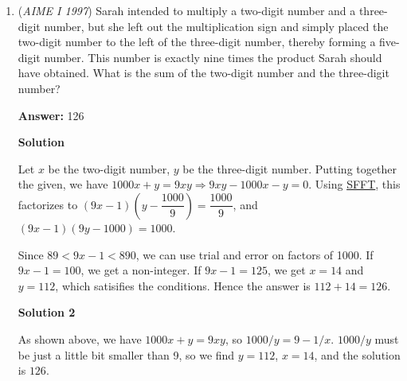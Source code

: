 \begin{enumerate}
 Then, to find the number of rectangles, first note that a square falls under the definition of a rectangle. We can break up the rectangles into cases for the length x width. As we note down the cases for $1$x$1, 1$x$2 , 2$x$1, 2$x$2,...,$ we see they are respectively $8$x$8, 8$x$7, 7$x$8, 7$x$7, ...$. We can quickly generalize this pattern to basically just ${\sum^8_{i=1}{i}}\cdot{\sum^8_{i=1}{i}}$. This gets us ${(\frac{9\cdot8}{2})}^2,$ which is just $1296.$

 Now, to calculate the ratio of $s/r,$ we divide $204$ by $1296$ to get a simplified fraction of $\frac{17}{108}.$

 Thus, our answer is just $s + r = 17+108 = \boxed{125}$~MathWhiz35

 


	\item (\textit{AIME I 1997}) Sarah intended to multiply a two-digit number and a three-digit number, but she left out the multiplication sign and simply placed the two-digit number to the left of the three-digit number, thereby forming a five-digit number.  This number is exactly nine times the product Sarah should have obtained.  What is the sum of the two-digit number and the three-digit number?


 
 \textbf{Answer: }126



\textbf{Solution}

Let $x$ be the two-digit number, $y$ be the three-digit number. Putting together the given, we have $1000x+y=9xy \Longrightarrow 9xy-1000x-y=0$. Using \href{https://artofproblemsolving.com/wiki/index.php?title=Simon\%27s\_Favorite\_Factoring\_Trick}{SFFT}, this factorizes to $(9x-1)\left(y-\dfrac{1000}{9}\right)=\dfrac{1000}{9}$, and $(9x-1)(9y-1000)=1000$.

 Since $89 < 9x-1 < 890$, we can use trial and error on factors of 1000. If $9x - 1 = 100$, we get a non-integer. If $9x - 1 = 125$, we get $x=14$ and $y=112$, which satisifies the conditions. Hence the answer is $112 + 14 = \boxed{126}$.

 



\textbf{Solution 2}

As shown above, we have $1000x+y=9xy$, so $1000/y=9-1/x$. $1000/y$ must be just a little bit smaller than 9, so we find $y=112$, $x=14$, and the solution is $\boxed{126}$.

 



\end{enumerate}
